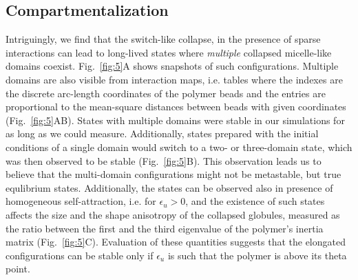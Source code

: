 \documentclass[
preprint,
a4paper,
12pt,
superscriptaddress,
pre]{revtex4}
\begin{document}
\subsection*{Compartmentalization}


Intriguingly, we find that the switch-like collapse, in the presence
of sparse interactions can lead to long-lived states where
\emph{multiple} collapsed micelle-like domains
coexist. Fig.~\ref{fig:5}A shows snapshots of such
configurations. Multiple domains are also visible from interaction
maps, i.e. tables where the indexes are the discrete arc-length
coordinates of the polymer beads and the entries are proportional to
the mean-square distances between beads with given coordinates
(Fig.~\ref{fig:5}AB).
States with multiple domains were stable in our simulations for as
long as we could measure. Additionally, states prepared with the
initial conditions of a single domain would switch to a two- or
three-domain state, which was then observed to be stable
(Fig.~\ref{fig:5}B). This observation leads us to believe that the
multi-domain configurations might not be metastable, but true
equlibrium states.
%
Additionally, the states can be observed also in presence of
homogeneous self-attraction, i.e. for $\epsilon_u>0$, and the
existence of such states affects the size and the shape anisotropy of
the collapsed globules, measured as the ratio between the first and
the third eigenvalue of the polymer's inertia matrix
(Fig.~\ref{fig:5}C). Evaluation of these quantities suggests that the
elongated configurations can be stable only if $\epsilon_u$ is such
that the polymer is above its theta point.
%
%
\end{document}

